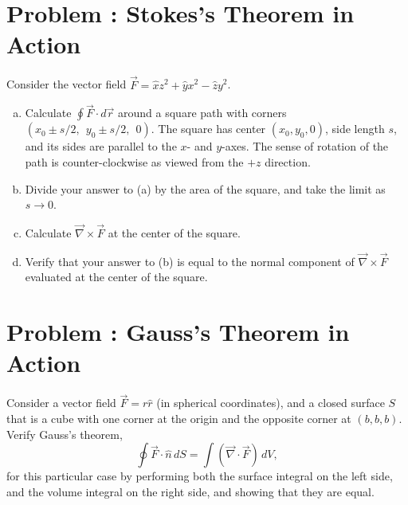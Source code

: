 \documentclass[problems]{esg8022pset}
\begin{document}
\section{Problem \thesection: Stokes's Theorem in Action}
  Consider the vector field $\vec{F} = \hat{x} z^2 + \hat{y} x^2 - \hat{z} y^2$.
  \begin{enumerate}[(a)]
    \item Calculate $\oint \vec{F} \cdot d\vec{r}$ around a square path with
      corners $(x_0 \pm s/2,~~y_0 \pm s/2,~~0)$. The square has
      center $(x_0,y_0,0)$, side length $s$, and its sides are parallel to
      the $x$- and $y$-axes. The sense of rotation of the path
      is counter-clockwise as viewed from the $+z$ direction.
    \item Divide your answer to (a) by the area of the square, and take
      the limit as $s\rightarrow 0$.
    \item Calculate $\vec{\nabla}\times \vec{F}$ at the center of the square.
    \item Verify that your answer to (b) is equal to the normal component
      of $\vec{\nabla}\times\vec{F}$ evaluated at the center of the square.
  \end{enumerate}
\section{Problem \thesection: Gauss's Theorem in Action}
  Consider a vector field
  $\vec{F} = r\hat{r}$ (in spherical coordinates), and a closed
  surface $S$ that is a cube with one corner at the origin and the
  opposite corner at $(b,b,b)$.  Verify Gauss's theorem,
  $$\oint \vec{F}\cdot\hat{n}\,dS = \int (\vec{\nabla}\cdot\vec{F})\,dV,$$
  for this particular case by performing both the surface integral on the
  left side, and the volume integral on the right side, and showing that
  they are equal.
\end{document}
